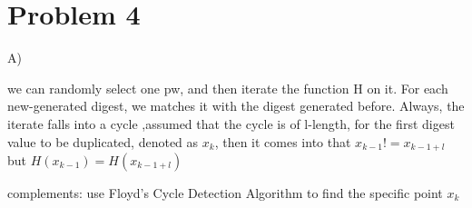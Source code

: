 \documentclass{6160}
\begin{document}
\newpage
\section*{Problem 4}

A)

we can randomly select one pw, and then iterate the function H on it. For each new-generated digest, we matches it
with the digest generated before. Always, the iterate falls into a cycle ,assumed that the cycle is of l-length, for the first digest value to be duplicated,
denoted as $x_k$, then it comes into that $x_{k - 1} != x_{k - 1 + l}$ but $H(x_{k - 1}) = H(x_{k - 1 + l})$

complements: use Floyd's Cycle Detection Algorithm to find the specific point $x_k$
\end{document}
